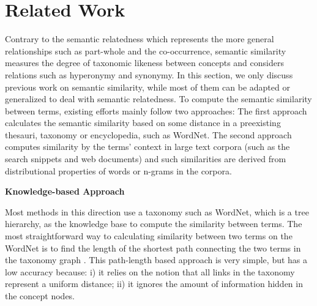 \section{Related Work}
\label{sec:related}

Contrary to the semantic relatedness which represents the more general relationships such as part-whole and the co-occurrence, semantic
similarity measures the degree of taxonomic likeness between concepts and considers relations such as hyperonymy and synonymy. In this section,
we only discuss previous work on semantic similarity, while most of them can be adapted or generalized to deal with semantic relatedness. To
compute the semantic similarity between terms, existing efforts mainly
follow two approaches: The first approach calculates the semantic
similarity based on some distance in a preexisting thesauri, taxonomy or encyclopedia, such as WordNet. The second approach computes similarity
by the terms' context in large text corpora (such as the search snippets and web documents) and such similarities are derived from
distributional properties of words or n-grams in the corpora.

{\noindent\textbf{Knowledge-based Approach}}

Most methods in this direction use a taxonomy such as WordNet, which is
a tree hierarchy, as the knowledge base to compute
the similarity between terms.
The most straightforward way to calculating similarity between two
terms on the WordNet is to find the length of the shortest path
connecting the two terms in the taxonomy graph \cite{Rada:1989}.
This path-length based approach is very simple, but has a low accuracy
because: i) it relies on the notion that all links in the taxonomy represent
a uniform distance; ii) it ignores the amount of information hidden in the concept nodes.

